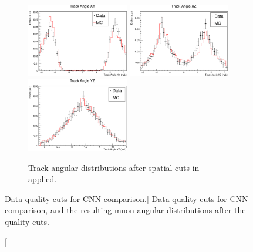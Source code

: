 \begin{figure}
	\begin{subfigure}[b]{\textwidth}
		\centering
		\vspace{0.5cm}
		\includegraphics[width=0.488\textwidth]{figures/angXY_cuts.pdf}
		\hfill
		\includegraphics[width=0.488\textwidth]{figures/angXZ_cuts.pdf}
		\includegraphics[width=0.488\textwidth]{figures/angYZ_cuts.pdf}
		\caption {Track angular distributions after spatial cuts in 
		 applied.}
		\label{fig:angular_dist}
	\end{subfigure}

	\caption 
	[Data quality cuts for CNN comparison.]
	{Data quality cuts for CNN comparison, and the resulting muon angular
	distributions after the quality cuts.}
	\label{fig:cnn_cuts_spatial}

\end{figure}

